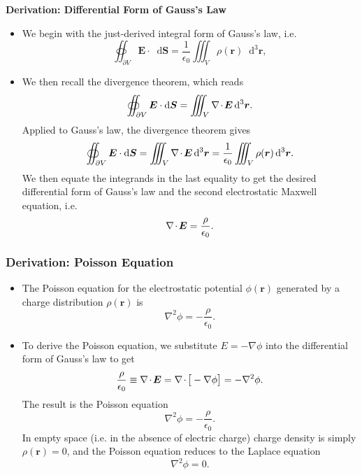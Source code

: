 \documentclass[11pt, a4paper]{article}
\newcommand{\diff}{\mathop{}\!\mathrm{d}} %
\newcommand{\dr}{\diff^{3} \r}  %
\renewcommand{\vec}[1]{\bm{#1}} %
\renewcommand{\r}{\vec{r}}
\newcommand{\E}{\vec{E}} %
\newcommand{\ee}{\epsilon_{0}}  %
\renewcommand{\div}{\nabla \mspace{-2mu} \cdot \mspace{-2mu}}
\renewcommand{\grad}{\nabla}
\renewcommand{\laplacian}{\nabla^{2}}
\begin{document}
\begin{itemize}
\end{itemize}


\textbf{Derivation: Differential Form of Gauss's Law}
\begin{itemize}
    
    \item We begin with the just-derived integral form of Gauss's law, i.e.
    \begin{equation*}
		\oiint_{\partial V} \E \cdot \diff \vec{S} = \frac{1}{\ee}\iiint_{V} \rho(\r) \dr,
    \end{equation*}
    
	\item We then recall the divergence theorem, which reads
	\begin{equation*}
		\oiint_{\partial V} \E \cdot \diff \vec{S} = \iiint_{V}\div \E \dr.
	\end{equation*}
	Applied to Gauss's law, the divergence theorem gives
	\begin{equation*}
		\oiint_{\partial V} \E \cdot \diff \vec{S} = \iiint_{V}\div \E \dr = \frac{1}{\ee} \iiint_{V} \rho(\r) \dr.
	\end{equation*}
	We then equate the integrands in the last equality to get the desired differential form of Gauss's law and the second electrostatic Maxwell equation, i.e.
	\begin{equation*}
		\div \E = \frac{\rho}{\ee}.
	\end{equation*}

\end{itemize}

\subsubsection{Derivation: Poisson Equation}
\begin{itemize}
    \item The Poisson equation for the electrostatic potential $ \phi(\r) $ generated by a charge distribution $ \rho(\r) $ is
    \begin{equation*}
        \laplacian \phi = - \frac{\rho}{\ee}.
    \end{equation*}
    
    \item To derive the Poisson equation, we substitute $ E = - \grad \phi $ into the differential form of Gauss's law to get
	\begin{equation*}
		\frac{\rho}{\ee} \equiv \div \E = \div \big[- \grad \phi \big]= - \laplacian \phi.
	\end{equation*}
	The result is the Poisson equation
	\begin{equation*}
		\laplacian \phi = - \frac{\rho}{\ee}.
	\end{equation*}
	In empty space (i.e. in the absence of electric charge) charge density is simply $ \rho(\r) = 0 $, and the Poisson equation reduces to the Laplace equation
	\begin{equation*}
		\laplacian \phi = 0.
	\end{equation*}
    
\end{itemize}
    
\end{document}

